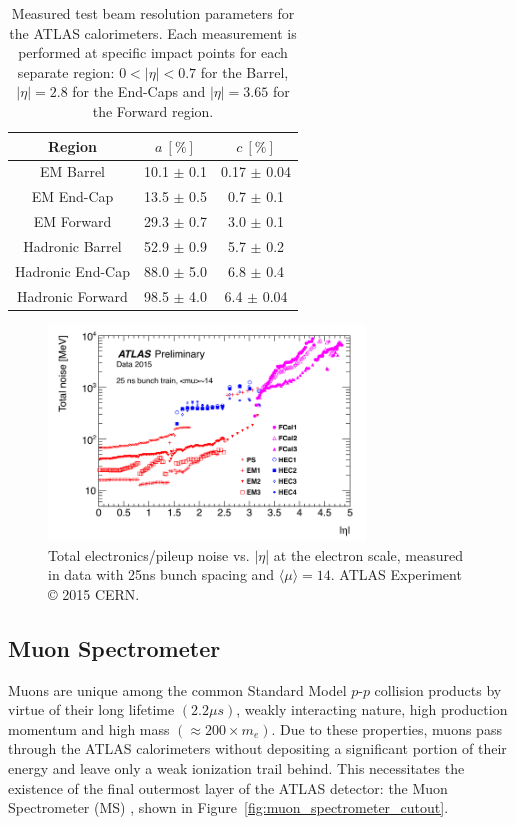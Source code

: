 \begin{table}
\centering
\begin{tabular}{|c|c|c|} 
\hline
Region & $a\ [\%]$ & $c\ [\%]$ \\
\hline\hline
EM Barrel & 10.1 $\pm$ 0.1 & 0.17 $\pm$ 0.04 \\
\hline
EM End-Cap & 13.5 $\pm$ 0.5 & 0.7 $\pm$ 0.1 \\
\hline
EM Forward & 29.3 $\pm$ 0.7 & 3.0 $\pm$ 0.1 \\
\hline
Hadronic Barrel & 52.9 $\pm$ 0.9 & 5.7 $\pm$ 0.2 \\
\hline
Hadronic End-Cap & 88.0 $\pm$ 5.0 & 6.8 $\pm$ 0.4 \\
\hline
Hadronic Forward & 98.5 $\pm$ 4.0 & 6.4 $\pm$ 0.04 \\
\hline
\end{tabular}
\caption{
    Measured test beam resolution parameters for the ATLAS calorimeters.
    Each measurement is performed at specific impact points for each separate region: $0 < |\eta| < 0.7$ for the Barrel, $|\eta| = 2.8$ for the End-Caps and $|\eta| = 3.65$ for the Forward region.
}
\label{tab:calo_res}
\end{table}

\begin{figure}
	\centering
	\includegraphics[width=0.75\textwidth]{calo_electronics_noise}
	\caption{Total electronics/pileup noise vs. $|\eta$| at the electron scale, measured in data with 25ns bunch spacing and $\langle \mu \rangle = 14$. ATLAS Experiment © 2015 CERN.}
	\label{fig:calo_noise}
\end{figure}

\subsection{Muon Spectrometer}
\label{sec:muon_spectrometer}
Muons are unique among the common Standard Model $p$-$p$ collision products by virtue of their long lifetime $(2.2 \mu s)$, weakly interacting nature, high production momentum and high mass $(\approx 200 \times m_e)$.
Due to these properties, muons pass through the ATLAS calorimeters without depositing a significant portion of their energy and leave only a weak ionization trail behind.
This necessitates the existence of the final outermost layer of the ATLAS detector: the Muon Spectrometer (MS) \cite{CERN-LHCC-97-022}, shown in Figure~\ref{fig:muon_spectrometer_cutout}.

